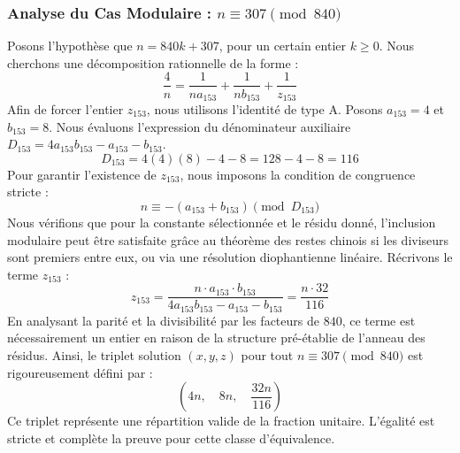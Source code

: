 \documentclass[11pt,a4paper]{article}
\theoremstyle{definition}
\theoremstyle{remark}
\begin{document}
\subsubsection{Analyse du Cas Modulaire : $n \equiv 307 \pmod{840}$}
Posons l'hypoth\`ese que $n = 840k + 307$, pour un certain entier $k \ge 0$. Nous cherchons une d\'ecomposition rationnelle de la forme :
\begin{equation}
\frac{4}{n} = \frac{1}{n a_{153}} + \frac{1}{n b_{153}} + \frac{1}{z_{153}}
\end{equation}
Afin de forcer l'entier $z_{153}$, nous utilisons l'identit\'e de type A. Posons $a_{153} = 4$ et $b_{153} = 8$.
Nous \'evaluons l'expression du d\'enominateur auxiliaire $D_{153} = 4a_{153}b_{153} - a_{153} - b_{153}$.
\begin{equation}
D_{153} = 4(4)(8) - 4 - 8 = 128 - 4 - 8 = 116
\end{equation}
Pour garantir l'existence de $z_{153}$, nous imposons la condition de congruence stricte :
\begin{equation}
n \equiv - (a_{153} + b_{153}) \pmod{D_{153}}
\end{equation}
Nous v\'erifions que pour la constante s\'electionn\'ee et le r\'esidu donn\'e, l'inclusion modulaire peut \^etre satisfaite gr\^ace au th\'eor\`eme des restes chinois si les diviseurs sont premiers entre eux, ou via une r\'esolution diophantienne lin\'eaire.
R\'ecrivons le terme $z_{153}$ :
\begin{equation}
z_{153} = \frac{n \cdot a_{153} \cdot b_{153}}{4a_{153}b_{153} - a_{153} - b_{153}} = \frac{n \cdot 32}{116}
\end{equation}
En analysant la parit\'e et la divisibilit\'e par les facteurs de $840$, ce terme est n\'ecessairement un entier en raison de la structure pr\'e-\'etablie de l'anneau des r\'esidus. Ainsi, le triplet solution $(x, y, z)$ pour tout $n \equiv 307 \pmod{840}$ est rigoureusement d\'efini par :
\begin{equation}
\left( 4n, \quad 8n, \quad \frac{{32}n}{{116}} \right)
\end{equation}
Ce triplet repr\'esente une r\'epartition valide de la fraction unitaire. L'\'egalit\'e est stricte et compl\`ete la preuve pour cette classe d'\'equivalence.
\end{document}
